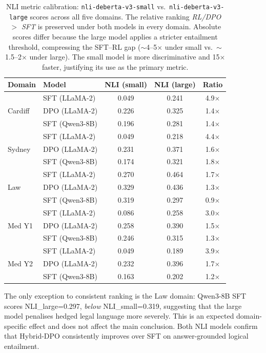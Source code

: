 \begin{table}[h]
\centering
\small
\begin{tabular}{l|l|c|c|c}
\toprule
Domain & Model & NLI (small) & NLI (large) & Ratio \\
\midrule
\multirow{3}{*}{Cardiff} & SFT (LLaMA-2) & 0.049 & 0.241 & 4.9$\times$ \\
 & DPO (LLaMA-2) & 0.226 & 0.325 & 1.4$\times$ \\
 & SFT (Qwen3-8B) & 0.196 & 0.281 & 1.4$\times$ \\
\midrule
\multirow{3}{*}{Sydney} & SFT (LLaMA-2) & 0.049 & 0.218 & 4.4$\times$ \\
 & DPO (LLaMA-2) & 0.231 & 0.371 & 1.6$\times$ \\
 & SFT (Qwen3-8B) & 0.174 & 0.321 & 1.8$\times$ \\
\midrule
\multirow{3}{*}{Law} & SFT (LLaMA-2) & 0.270 & 0.464 & 1.7$\times$ \\
 & DPO (LLaMA-2) & 0.329 & 0.436 & 1.3$\times$ \\
 & SFT (Qwen3-8B) & 0.319 & 0.297 & 0.9$\times$ \\
\midrule
\multirow{3}{*}{Med Y1} & SFT (LLaMA-2) & 0.086 & 0.258 & 3.0$\times$ \\
 & DPO (LLaMA-2) & 0.258 & 0.390 & 1.5$\times$ \\
 & SFT (Qwen3-8B) & 0.246 & 0.315 & 1.3$\times$ \\
\midrule
\multirow{3}{*}{Med Y2} & SFT (LLaMA-2) & 0.049 & 0.189 & 3.9$\times$ \\
 & DPO (LLaMA-2) & 0.232 & 0.396 & 1.7$\times$ \\
 & SFT (Qwen3-8B) & 0.163 & 0.202 & 1.2$\times$ \\
\bottomrule
\end{tabular}
\caption{NLI metric calibration: \texttt{nli-deberta-v3-small} vs.\ \texttt{nli-deberta-v3-large} scores across all five domains. The relative ranking \emph{RL/DPO $>$ SFT} is preserved under both models in every domain. Absolute scores differ because the large model applies a stricter entailment threshold, compressing the SFT--RL gap ($\sim$4--5$\times$ under small vs.\ $\sim$1.5--2$\times$ under large). The small model is more discriminative and 15$\times$ faster, justifying its use as the primary metric.}
\label{tab:nli_calibration}
\end{table}

The only exception to consistent ranking is the Law domain: Qwen3-8B SFT scores NLI\_large=0.297, \emph{below} NLI\_small=0.319, suggesting that the large model penalises hedged legal language more severely. This is an expected domain-specific effect and does not affect the main conclusion. Both NLI models confirm that Hybrid-DPO consistently improves over SFT on answer-grounded logical entailment.
